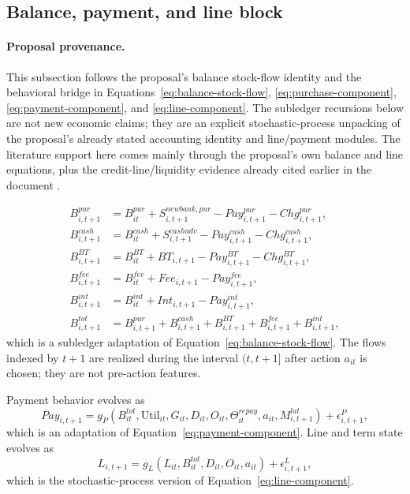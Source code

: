 \documentclass[11pt]{article}
\newcommand{\1}{\mathbf{1}}
\begin{document}
\subsection{Balance, payment, and line block}
\label{subsec:state-space-balance-block}

\paragraph{Proposal provenance.}
This subsection follows the proposal's balance stock-flow identity and the
behavioral bridge in Equations~\eqref{eq:balance-stock-flow},
\eqref{eq:purchase-component}, \eqref{eq:payment-component}, and
\eqref{eq:line-component}. The subledger recursions below are not new economic
claims; they are an explicit stochastic-process unpacking of the proposal's
already stated accounting identity and line/payment modules. The literature
support here comes mainly through the proposal's own balance and line equations,
plus the credit-line/liquidity evidence already cited earlier in the document
\citep{gross2001liquidity}.

\begin{align}
  B^{pur}_{i,t+1}
    &= B^{pur}_{it} + S^{newbank,pur}_{i,t+1} - Pay^{pur}_{i,t+1}
       - Chg^{pur}_{i,t+1},
       \label{eq:ss-balance-pur}\\
  B^{cash}_{i,t+1}
    &= B^{cash}_{it} + S^{cashadv}_{i,t+1} - Pay^{cash}_{i,t+1}
       - Chg^{cash}_{i,t+1},
       \label{eq:ss-balance-cash}\\
  B^{BT}_{i,t+1}
    &= B^{BT}_{it} + BT_{i,t+1} - Pay^{BT}_{i,t+1}
       - Chg^{BT}_{i,t+1},
       \label{eq:ss-balance-bt}\\
  B^{fee}_{i,t+1}
    &= B^{fee}_{it} + Fee_{i,t+1} - Pay^{fee}_{i,t+1},
       \label{eq:ss-balance-fee}\\
  B^{int}_{i,t+1}
    &= B^{int}_{it} + Int_{i,t+1} - Pay^{int}_{i,t+1},
       \label{eq:ss-balance-int}\\
  B^{tot}_{i,t+1}
    &= B^{pur}_{i,t+1}+B^{cash}_{i,t+1}+B^{BT}_{i,t+1}
       +B^{fee}_{i,t+1}+B^{int}_{i,t+1},
       \label{eq:ss-balance-total}
\end{align}
which is a subledger adaptation of Equation~\eqref{eq:balance-stock-flow}. The
flows indexed by $t+1$ are realized during the interval $(t,t+1]$ after action
$a_{it}$ is chosen; they are not pre-action features.

Payment behavior evolves as
\begin{equation}
  Pay_{i,t+1}
  =
  g_P(B^{tot}_{it},\mathrm{Util}_{it},G_{it},D_{it},O_{it},\Theta^{repay}_{it},a_{it},M^{lat}_{i,t+1})
  + \epsilon^P_{i,t+1},
  \label{eq:ss-payment-transition}
\end{equation}
which is an adaptation of Equation~\eqref{eq:payment-component}. Line and term
state evolves as
\begin{equation}
  L_{i,t+1}
  =
  g_L(L_{it},B^{tot}_{it},D_{it},O_{it},a_{it}) + \epsilon^L_{i,t+1},
  \label{eq:ss-line-transition}
\end{equation}
which is the stochastic-process version of Equation~\eqref{eq:line-component}.
\end{document}
